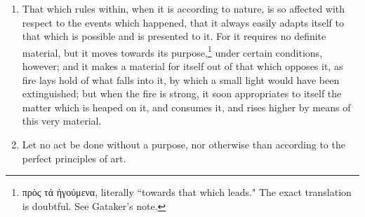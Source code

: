 \begin{enumerate}
\item That which rules within, when it is according to nature, is so affected with respect to the events which happened, that it always easily adapts itself to that which is possible and is presented to it. For it requires no definite material, but it moves towards its purpose,\footnote{\textgreek{πρὸς τἁ ἡγούμενα}, literally ``towards that which leads." The exact translation is doubtful. See Gataker's note.} under certain conditions, however; and it makes a material for itself out of that which opposes it, as fire lays hold of what falls into it, by which a small light would have been extinguished; but when the fire is strong, it soon appropriates to itself the matter which is heaped on it, and consumes it, and rises higher by means of this very material.

\item Let no act be done without a purpose, nor otherwise than according to the perfect principles of art.


\end{enumerate}
